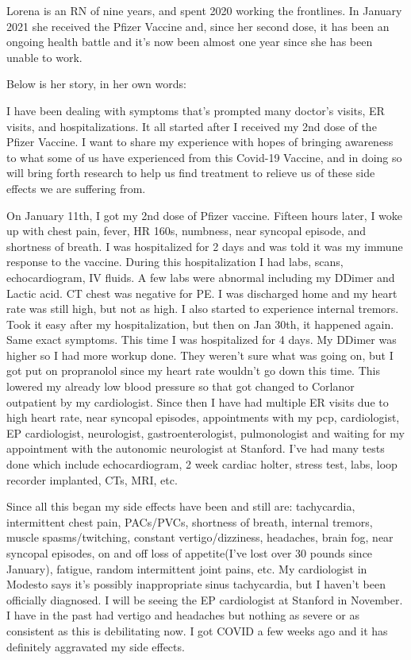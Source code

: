 Lorena is an RN of nine years, and spent 2020 working the frontlines. In January
2021 she received the Pfizer Vaccine and, since her second dose, it has been an
ongoing health battle and it’s now been almost one year since she has been
unable to work.

Below is her story, in her own words:

I have been dealing with symptoms that’s prompted many doctor’s visits, ER
visits, and hospitalizations. It all started after I received my 2nd dose of the
Pfizer Vaccine. I want to share my experience with hopes of bringing awareness
to what some of us have experienced from this Covid-19 Vaccine, and in doing so
will bring forth research to help us find treatment to relieve us of these side
effects we are suffering from.

On January 11th, I got my 2nd dose of Pfizer vaccine. Fifteen hours later, I
woke up with chest pain, fever, HR 160s, numbness, near syncopal episode, and
shortness of breath. I was hospitalized for 2 days and was told it was my immune
response to the vaccine. During this hospitalization I had labs, scans,
echocardiogram, IV fluids. A few labs were abnormal including my DDimer and
Lactic acid. CT chest was negative for PE. I was discharged home and my heart
rate was still high, but not as high. I also started to experience internal
tremors. Took it easy after my hospitalization, but then on Jan 30th, it
happened again. Same exact symptoms. This time I was hospitalized for 4 days. My
DDimer was higher so I had more workup done. They weren’t sure what was going
on, but I got put on propranolol since my heart rate wouldn’t go down this
time. This lowered my already low blood pressure so that got changed to Corlanor
outpatient by my cardiologist. Since then I have had multiple ER visits due to
high heart rate, near syncopal episodes, appointments with my pcp, cardiologist,
EP cardiologist, neurologist, gastroenterologist, pulmonologist and waiting for
my appointment with the autonomic neurologist at Stanford. I’ve had many tests
done which include echocardiogram, 2 week cardiac holter, stress test, labs,
loop recorder implanted, CTs, MRI, etc.

Since all this began my side effects have been and still are: tachycardia,
intermittent chest pain, PACs/PVCs, shortness of breath, internal tremors,
muscle spasms/twitching, constant vertigo/dizziness, headaches, brain fog, near
syncopal episodes, on and off loss of appetite(I’ve lost over 30 pounds since
January), fatigue, random intermittent joint pains, etc. My cardiologist in
Modesto says it’s possibly inappropriate sinus tachycardia, but I haven’t been
officially diagnosed. I will be seeing the EP cardiologist at Stanford in
November. I have in the past had vertigo and headaches but nothing as severe or
as consistent as this is debilitating now. I got COVID a few weeks ago and it
has definitely aggravated my side effects.

